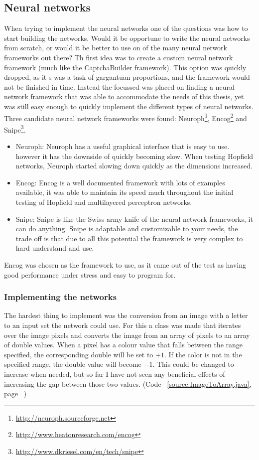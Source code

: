 \documentclass[pdftex,a4paper,12pt,twoside]{report}
\theoremstyle{plain} \newtheorem{theorem}{Theorem} \newtheorem{proposition}{Proposition} \newtheorem{lemma}{Lemma} \newtheorem*{corollary}{Corollary}
\theoremstyle{definition} \newtheorem{definition}{Definition} \newtheorem{conjecture}{Conjecture} \newtheorem*{example}{Example} \newtheorem{algorithm}{Algorithm}
\theoremstyle{remark} \newtheorem*{remark}{Remark} \newtheorem*{note}{Note} \newtheorem{case}{Case}
\begin{document}
\subsection{Neural networks}
When trying to implement the neural networks one of the questions was how to start building the networks. Would it be opportune to write the neural networks from scratch, or would it be better to use on of the many neural network frameworks out there? Th first idea was to create a custom neural network framework (much like the CaptchaBuilder framework). This option was quickly dropped, as it s was a task of gargantuan proportions, and the framework would not be finished in time. Instead the focussed was placed on finding a neural network framework that was able to accommodate the needs of this thesis, yet was still easy enough to quickly implement the different types of neural networks. Three candidate neural network frameworks were found: Neuroph\footnote{\url{http://neuroph.sourceforge.net}}, Encog\footnote{\url{http://www.heatonresearch.com/encog}} and Snipe\footnote{\url{http://www.dkriesel.com/en/tech/snipe}}.
\begin{itemize}
\item Neuroph: Neuroph has a useful graphical interface that is easy to use. however it has the downside of quickly becoming slow. When testing Hopfield networks, Neuroph started slowing down quickly as the dimensions increased.
\item Encog: Encog is a well documented framework with lots of examples available, it was able to maintain its speed much throughout the initial testing of Hopfield and multilayered perceptron networks.
\item Snipe: Snipe is like the Swiss army knife of the neural network frameworks, it can do anything. Snipe is adaptable and customizable to your needs, the trade off is that due to all this potential the framework is very complex to hard understand and use.
\end{itemize}
Encog was chosen as the framework to use, as it came out of the test as having good performance under stress and easy to program for.
\subsubsection{Implementing the networks}
The hardest thing to implement was the conversion from an image with a letter to an input set the network could use. For this a class was made that iterates over the image pixels and converts the image from an array of pixels to an array of double values. When a pixel has a colour value that falls between the range specified, the corresponding double will be set to $+1$. If the color is not in the specified range, the double value will become $-1$. This could be changed to increase when needed, but so far I have not seen any beneficial effects of increasing the gap between those two values. (Code ~\ref{source:ImageToArray.java}, page ~\pageref{source:ImageToArray.java})
\end{document}
